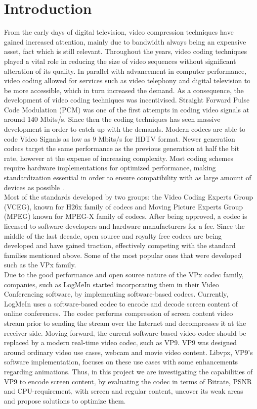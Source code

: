 \documentclass[a4paper,11pt,oneside]{article}
\begin{document}
\section{Introduction}
\indent From the early days of digital television, video compression techniques have gained increased attention, mainly due to bandwidth always being
an expensive asset, fact which is still relevant. Throughout the years, video coding techniques played a vital role in reducing the size of video sequences without significant alteration of its quality. In parallel with advancement in computer performance, video coding allowed for services such as video telephony and digital television to be more accessible, which in turn increased the demand. As a consequence, the development of video coding techniques was incentivised.
Straight Forward Pulse Code Modulation (PCM) was one of the first attempts in coding video signals at around 140 Mbits/s. Since then the coding techniques has seen massive development in order to catch up with the demands. Modern codecs are able to code Video Signals as low as 9 Mbits/s for HDTV format. Newer generation codecs target the same performance as the previous generation at half the  bit rate, however at the expense of increasing complexity. Most coding schemes require hardware implementations for optimized performance, making standardization essential in order to ensure compatibility with as large amount of devices
as possible \cite{ghanbari2011standard} . \\
\indent Most of the standards developed by two groups: the Video Coding Experts Group (VCEG), known for H26x family of codecs and Moving Picture Experts Group (MPEG) known for MPEG-X family of codecs. After being approved, a codec is licensed to software developers and hardware manufacturers for a fee. Since the middle of the last decade, open source and royalty free codecs are being developed and have gained traction, effectively competing with the standard families mentioned above. Some of the most popular ones that were developed such as the VPx family. \\
\indent Due to the good performance and open source nature of the VPx codec family, companies, such as LogMeIn started incorporating them in their Video Conferencing software, by implementing software-based codecs. Currently, LogMeIn uses a software-based codec to encode and decode screen content of online conferences. The codec performs compression of screen content video stream prior to sending the stream over the Internet and decompresses it at the receiver side. Moving forward, the current software-based video codec should be replaced by a modern real-time video codec, such as VP9. VP9 was designed around ordinary video use cases, webcam and movie video content. Libvpx, VP9’s software implementation, focuses on these use cases with some enhancements regarding animations. Thus, in this project we are investigating the capabilities of VP9 to encode screen content, by evaluating the codec in terms of Bitrate, PSNR and CPU-requirement, with screen and regular content, uncover its weak areas and propose solutions to optimize them.\\
\end{document}

